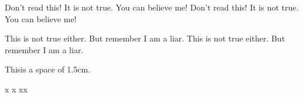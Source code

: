 \documentclass[12pt]{ctexrep}
\begin{document}
{\Large Don't read this!
It is not true.
You can believe me!
Don't read this!
It is not true.
You can believe me!\par}

{\Large This is not true either.
But remember I am a liar.
This is not true either.
But remember I am a liar.}\par 







This\hspace{1.5cm}is a space of 1.5cm.



x
x
x\hspace{\fill}x
\end{document}
